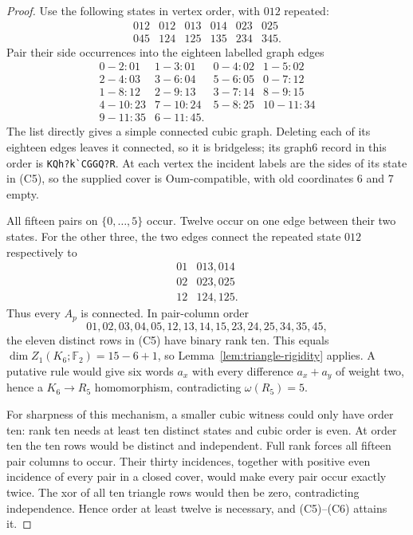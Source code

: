 \documentclass[11pt]{article}
\theoremstyle{definition}
\theoremstyle{remark}
\newcommand{\F}{\mathbb F}
\begin{document}
\begin{proof}
Use the following states in vertex order, with \(012\) repeated:
\[
\begin{array}{rrrrrr}
012&012&013&014&023&025\\
045&124&125&135&234&345.
\end{array}                                                   \tag{C5}
\]
Pair their side occurrences into the eighteen labelled graph edges
\[
\begin{array}{llll}
0\!-\!2:01&1\!-\!3:01&0\!-\!4:02&1\!-\!5:02\\
2\!-\!4:03&3\!-\!6:04&5\!-\!6:05&0\!-\!7:12\\
1\!-\!8:12&2\!-\!9:13&3\!-\!7:14&8\!-\!9:15\\
4\!-\!10:23&7\!-\!10:24&5\!-\!8:25&10\!-\!11:34\\
9\!-\!11:35&6\!-\!11:45.&&
\end{array}                                                   \tag{C6}
\]
The list directly gives a simple connected cubic graph.  Deleting each of
its eighteen edges leaves it connected, so it is bridgeless; its graph6
record in this order is \nolinkurl{KQh?k`CGGQ?R}.  At each vertex the
incident labels are the sides of its state in (C5), so the supplied cover
is Oum-compatible, with old coordinates 6 and 7 empty.

All fifteen pairs on \(\{0,\ldots,5\}\) occur.  Twelve occur on one edge
between their two states.  For the other three, the two edges connect the
repeated state \(012\) respectively to
\[
\begin{array}{c|c}
01&013,014\\
02&023,025\\
12&124,125.
\end{array}
\]
Thus every \(A_p\) is connected.  In pair-column order
\[
01,02,03,04,05,12,13,14,15,23,24,25,34,35,45,
\]
the eleven distinct rows in (C5) have binary rank ten.  This equals
\(\dim Z_1(K_6;\F_2)=15-6+1\), so
Lemma~\ref{lem:triangle-rigidity} applies.  A putative rule would give six
words \(a_x\) with every difference \(a_x+a_y\) of weight two, hence a
\(K_6\to R_5\) homomorphism, contradicting \(\omega(R_5)=5\).

For sharpness of this mechanism, a smaller cubic witness could only have
order ten: rank ten needs at least ten distinct states and cubic order is
even.  At order ten the ten rows would be distinct and independent.  Full
rank forces all fifteen pair columns to occur.  Their thirty incidences,
together with positive even incidence of every pair in a closed cover,
would make every pair occur exactly twice.  The xor of all ten triangle
rows would then be zero, contradicting independence.  Hence order at least
twelve is necessary, and (C5)--(C6) attains it.
\end{proof}
\end{document}
